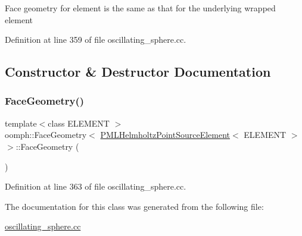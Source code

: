 Face geometry for element is the same as that for the underlying wrapped element 

Definition at line 359 of file oscillating\+\_\+sphere.\+cc.



\subsection{Constructor \& Destructor Documentation}
\mbox{\label{classoomph_1_1FaceGeometry_3_01PMLHelmholtzPointSourceElement_3_01ELEMENT_01_4_01_4_abf99f385b7c32969fdef43209e14ce79}} 
\subsubsection{\texorpdfstring{Face\+Geometry()}{FaceGeometry()}}
{\footnotesize\ttfamily template$<$class E\+L\+E\+M\+E\+NT $>$ \\
oomph\+::\+Face\+Geometry$<$ \hyperlink{classoomph_1_1PMLHelmholtzPointSourceElement}{P\+M\+L\+Helmholtz\+Point\+Source\+Element}$<$ E\+L\+E\+M\+E\+NT $>$ $>$\+::Face\+Geometry (\begin{DoxyParamCaption}{ }\end{DoxyParamCaption})\hspace{0.3cm}{\ttfamily [inline]}}



Definition at line 363 of file oscillating\+\_\+sphere.\+cc.



The documentation for this class was generated from the following file\+:\begin{DoxyCompactItemize}
\item 
\hyperlink{oscillating__sphere_8cc}{oscillating\+\_\+sphere.\+cc}\end{DoxyCompactItemize}
